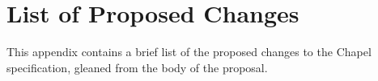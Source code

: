 \section{List of Proposed Changes}
\label{Changes}

This appendix contains a brief list of the proposed changes to the Chapel specification,
gleaned from the body of the proposal.


